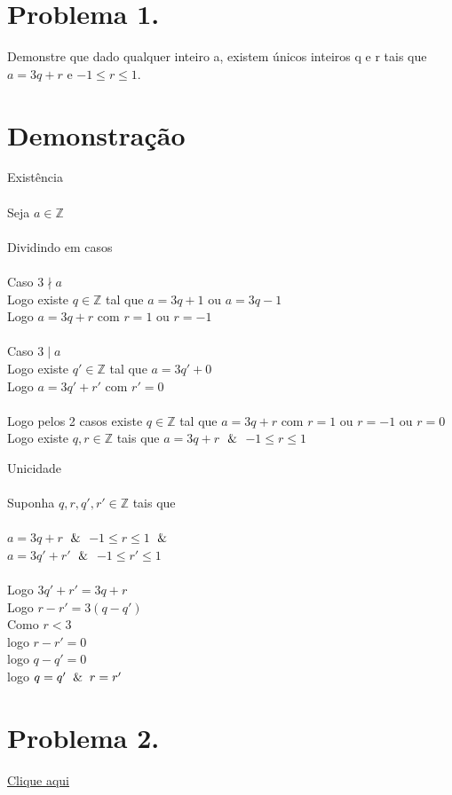 \documentclass[a4paper]{article}
\author{Dawerton Eduardo Carlos Vaz }
\def\ints{{\mathbb Z}}
\def\halmos{ \begin{flushright} \RectangleBold \end{flushright}}
\begin{document}
\section*{Problema 1.}
Demonstre que dado qualquer inteiro a, existem únicos inteiros q e r tais que $a = 3q + r$ e $-1 \leq r \leq 1$.



\section*{Demonstração}
Existência\\\\
Seja $a \in \ints{}$\\\\
Dividindo em casos\\\\
Caso $3 \nmid a$ \\
Logo existe $q \in \ints$ tal que $a=3q+1$ ou $a=3q-1$\\
Logo $a=3q+r$ com $r=1 $ ou $ r=-1$\\\\
Caso $3 \mid a$ \\
Logo existe $q' \in \ints$ tal que $a=3q'+0$\\
Logo $a=3q'+r'$ com $r'=0$\\\\
Logo pelos 2 casos existe $q\in \ints$ tal que $a=3q+r$ com $r=1$ ou $r=-1$ ou $r=0$\\
Logo existe $q,r \in \ints$ tais que $a=3q+r$ $\And$  $-1 \leq r \leq 1$
 \halmos
 Unicidade\\\\
 Suponha $q,r,q',r' \in \ints$ tais  que  \\\\
 $a=3q +r$ $\And$  $-1 \leq r \leq 1$ $\And$\\
 $a=3q'+r'$ $\And$  $-1 \leq r' \leq 1$\\\\
Logo $3q'+r'= 3q+r$\\
Logo $r-r'= 3(q-q')$\\
Como $r<3$\\
logo $r-r'=0$\\
logo $q-q'=0$\\
logo $q=q'\And r=r'$\\
\halmos
 \newpage
 \section*{Problema 2.}
\href{https://piazza.com/class_profile/get_resource/keqeithjxj94mi/khq0si0s95z71}{Clique aqui}
\end{document}

